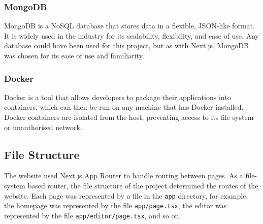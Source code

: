 \documentclass[../main.tex]{subfiles}
\begin{document}
            \subsubsection{MongoDB}
                MongoDB is a NoSQL database that stores data in a flexible, JSON-like format.
                It is widely used in the industry for its scalability, flexibility, and ease of
                    use.
                Any database could have been used for this project, but as with Next.js,
                    MongoDB was chosen for its ease of use and familiarity.

            \subsubsection{Docker}
                Docker is a tool that allows developers to package their applications into
                    containers, which can then be run on any machine that has Docker installed.
                Docker containers are isolated from the host, preventing access to its file
                    system or unauthorised network.

        \subsection{File Structure}
            The website used Next.js App Router to handle routing between pages.
            As a file-system based router, the file structure of the project determined the
                routes of the website.
            Each page was represented by a file in the \texttt{app} directory, for example,
                the homepage was represented by the file \texttt{app/page.tsx}, the editor was
                represented by the file \texttt{app/editor/page.tsx}, and so on.
\end{document}
